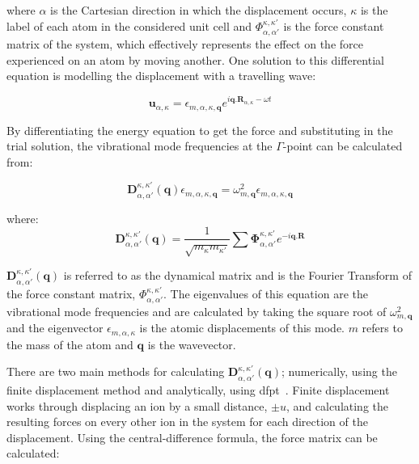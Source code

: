 where \(\alpha\) is the Cartesian direction in which the displacement occurs, \(\kappa\) is the label of each atom in the considered unit cell and \(\Phi_{\alpha, \alpha'}^{\kappa, \kappa'}\) is the force constant matrix of the system, which effectively represents the effect on the force experienced on an atom by moving another. One solution to this differential equation is modelling the displacement with a travelling wave:

\begin{equation}
\boldsymbol{u}_{\alpha, \kappa} = \epsilon_{m, \alpha, \kappa, \boldsymbol{q}}e^{i\boldsymbol{q}.\boldsymbol{R}_{\alpha, \kappa} - \omega t}
\end{equation}

By differentiating the energy equation to get the force and substituting in the trial solution, the vibrational mode frequencies at the \(\Gamma\)\nobreakdash-point can be calculated from:

\begin{equation}
\boldsymbol{D}_{\alpha, \alpha'}^{\kappa, \kappa'} (\boldsymbol{q}) \epsilon_{m, \alpha, \kappa, \boldsymbol{q}} = \omega^2_{m,\boldsymbol{q}} \epsilon_{m, \alpha, \kappa, \boldsymbol{q}}
\end{equation}

where:
\begin{equation}
\boldsymbol{D}_{\alpha, \alpha'}^{\kappa, \kappa'} (\boldsymbol{q}) = \frac{1}{\sqrt{m_{\kappa} m_{\kappa'}}} \sum \boldsymbol{\Phi}_{\alpha, \alpha'}^{\kappa, \kappa'} e^{-i\boldsymbol{q}.\boldsymbol{R}}
\end{equation}

\(\boldsymbol{D}_{\alpha, \alpha'}^{\kappa, \kappa'} (\boldsymbol{q})\) is referred to as the dynamical matrix and is the Fourier Transform of the force constant matrix, \(\Phi_{\alpha, \alpha'}^{\kappa, \kappa'}\). The eigenvalues of this equation are the vibrational mode frequencies and are calculated by taking the square root of \(\omega^2_{m,\boldsymbol{q}}\) and the eigenvector \(\epsilon_{m, \alpha, \kappa}\) is the atomic displacements of this mode. \(m\) refers to the mass of the atom and \(\boldsymbol{q}\) is the wavevector.

There are two main methods for calculating \(\boldsymbol{D}_{\alpha, \alpha'}^{\kappa, \kappa'} (\boldsymbol{q})\); numerically, using the finite displacement method and analytically, using \acrfull{dfpt}~\cite{Giannozzi2005}. Finite displacement~\cite{Kresse1995, Parlinski1997} works through displacing an ion by a small distance, \(\pm u\), and calculating the resulting forces on every other ion in the system for each direction of the displacement. Using the central-difference formula, the force matrix can be calculated:

